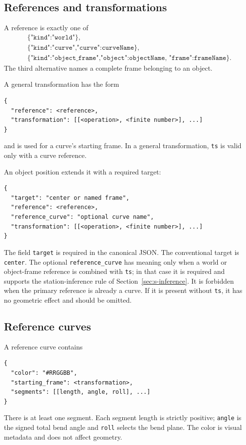 \documentclass[11pt,a4paper]{article}
\begin{document}
\subsection{References and transformations}

A reference is exactly one of
\begin{align*}
 &\texttt{\{"kind":"world"\}},\\
 &\texttt{\{"kind":"curve","curve":curveName\}},\\
 &\texttt{\{"kind":"object\_frame","object":objectName,
             "frame":frameName\}}.
\end{align*}
The third alternative names a complete frame belonging to an object.

A general transformation has the form
\begin{lstlisting}
{
  "reference": <reference>,
  "transformation": [[<operation>, <finite number>], ...]
}
\end{lstlisting}
and is used for a curve's starting frame.  In a general transformation,
\texttt{ts} is valid only with a curve reference.

An object position extends it with a required target:
\begin{lstlisting}
{
  "target": "center or named frame",
  "reference": <reference>,
  "reference_curve": "optional curve name",
  "transformation": [[<operation>, <finite number>], ...]
}
\end{lstlisting}
The field \texttt{target} is required in the canonical JSON.  The conventional
target is \texttt{center}.  The optional \texttt{reference\_curve} has meaning
only when a world or object-frame reference is combined with \texttt{ts}; in
that case it is required and supports the station-inference rule of
Section~\ref{sec:s-inference}.  It is forbidden when the primary reference is
already a curve.  If it is present without \texttt{ts}, it has no geometric
effect and should be omitted.

\subsection{Reference curves}

A reference curve contains
\begin{lstlisting}
{
  "color": "#RRGGBB",
  "starting_frame": <transformation>,
  "segments": [[length, angle, roll], ...]
}
\end{lstlisting}
There is at least one segment.  Each segment length is strictly positive;
\texttt{angle} is the signed total bend angle and \texttt{roll} selects the bend
plane.  The color is visual metadata and does not affect geometry.
\end{document}
